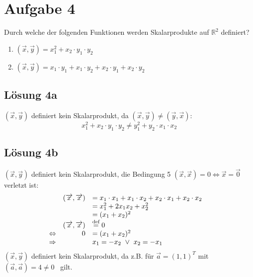 \documentclass[main.tex]{subfiles}
\begin{document}
\section{Aufgabe 4}
Durch welche der folgenden Funktionen werden Skalarprodukte auf $\mathbb{R}^{2}$ definiert?

\begin{enumerate}
    \item $\left(\vec{x} ,\vec{y}\right) =x_{1}^{2} +x_{2} \cdotp y_{1} \cdotp y_{2}$
    \item $\left(\vec{x} ,\vec{y}\right) =x_{1} \cdotp y_{1} +x_{1} \cdotp y_{2} +x_{2} \cdot y_{1} +x_{2} \cdot y_{2}$
\end{enumerate}

\subsection{Lösung 4a}
$\left(\vec{x} ,\vec{y}\right)$ definiert kein Skalarprodukt, da $\left(\vec{x} ,\vec{y}\right) \neq \left(\vec{y} ,\vec{x}\right)$:
\begin{equation*}
    x_{1}^{2} +x_{2} \cdotp y_{1} \cdotp y_{2} \neq y_{1}^{2} +y_{2} \cdotp x_{1} \cdotp x_{2}
\end{equation*}

\subsection{Lösung 4b}
$\left(\vec{x} ,\vec{y}\right)$ definiert kein Skalarprodukt, die Bedingung 5 $\left(\vec{x},\vec{x}\right) = 0 \Leftrightarrow \vec{x} = \vec{0}$ verletzt ist:
\begin{equation*}
    \begin{array}{ c r l c }
    & \left(\overrightarrow{x} ,\overrightarrow{x}\right) & =x_{1} \cdot x_{1} +x_{1} \cdot x_{2} +x_{2} \cdot x_{1} +x_{2} \cdot x_{2} & \\
    &  & =x_{1}^{2} +2x_{1} x_{2} +x_{2}^{2} & \\
    &  & =( x_{1} +x_{2})^{2} & \\
    & \left(\overrightarrow{x} ,\overrightarrow{x}\right) & \stackrel{\text{def}}{=} 0 & \\
    \Leftrightarrow  & 0 & =( x_{1} +x_{2})^{2} & \\
    \Rightarrow  &  & x_{1} =-x_{2} \ \lor \ x_{2} =-x_{1} &
    \end{array}
\end{equation*}
$\left(\vec{x} ,\vec{y}\right)$ definiert kein Skalarprodukt, da z.B. für $\vec{a} =(1,1)^{T}$ mit $\left(\vec{a} ,\vec{a}\right) =4 \neq 0$ \ gilt.
\end{document}
